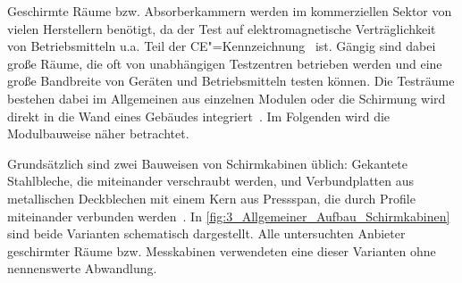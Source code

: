 

Geschirmte Räume bzw. Absorberkammern werden im kommerziellen Sektor von vielen Herstellern benötigt, da der Test auf elektromagnetische Verträglichkeit von Betriebsmitteln u.a. Teil der CE"=Kennzeichnung~\cite{Richtlinie_2014/30/EU} ist. Gängig sind dabei große Räume, die oft von unabhängigen Testzentren betrieben werden und eine große Bandbreite von Geräten und Betriebsmitteln testen können. Die Testräume bestehen dabei im Allgemeinen aus einzelnen Modulen oder die Schirmung wird direkt in die Wand eines Gebäudes integriert~\cite{EM_Schirmung}. Im Folgenden wird die Modulbauweise näher betrachtet.
\par
\vspace{\linespace}
Grundsätzlich sind zwei Bauweisen von Schirmkabinen üblich: Gekantete Stahlbleche, die miteinander verschraubt werden, und Verbundplatten aus metallischen Deckblechen mit einem Kern aus Pressspan, die durch Profile miteinander verbunden werden~\cite{EM_Schirmung, Design_of_shielded_enclosures}. In \Abb\ref{fig:3_Allgemeiner_Aufbau_Schirmkabinen} sind beide Varianten schematisch dargestellt. Alle untersuchten Anbieter geschirmter Räume bzw. Messkabinen verwendeten eine dieser Varianten ohne nennenswerte Abwandlung.

